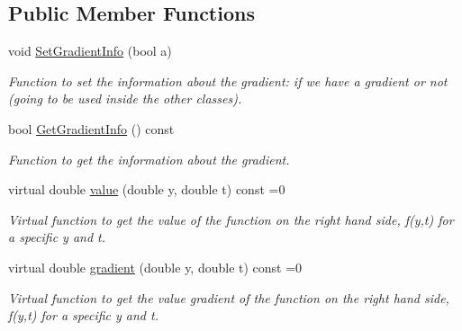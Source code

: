 \subsection*{Public Member Functions}
\begin{DoxyCompactItemize}
\item 
\hypertarget{class_righthandside_ab9a7d9fb588db3cf6f0793dd3c610b21}{}void \hyperlink{class_righthandside_ab9a7d9fb588db3cf6f0793dd3c610b21}{Set\+Gradient\+Info} (bool a)\label{class_righthandside_ab9a7d9fb588db3cf6f0793dd3c610b21}

\begin{DoxyCompactList}\small\item\em Function to set the information about the gradient\+: if we have a gradient or not (going to be used inside the other classes). \end{DoxyCompactList}\item 
\hypertarget{class_righthandside_a789dc740ce5310a1ee78ca5ff19d965e}{}bool \hyperlink{class_righthandside_a789dc740ce5310a1ee78ca5ff19d965e}{Get\+Gradient\+Info} () const \label{class_righthandside_a789dc740ce5310a1ee78ca5ff19d965e}

\begin{DoxyCompactList}\small\item\em Function to get the information about the gradient. \end{DoxyCompactList}\item 
\hypertarget{class_righthandside_a6d32d90b10cecbcd7950f7cd1d9eea31}{}virtual double \hyperlink{class_righthandside_a6d32d90b10cecbcd7950f7cd1d9eea31}{value} (double y, double t) const  =0\label{class_righthandside_a6d32d90b10cecbcd7950f7cd1d9eea31}

\begin{DoxyCompactList}\small\item\em Virtual function to get the value of the function on the right hand side, f(y,t) for a specific y and t. \end{DoxyCompactList}\item 
\hypertarget{class_righthandside_a39748896cba8f34c145b46235ff2ee1a}{}virtual double \hyperlink{class_righthandside_a39748896cba8f34c145b46235ff2ee1a}{gradient} (double y, double t) const  =0\label{class_righthandside_a39748896cba8f34c145b46235ff2ee1a}

\begin{DoxyCompactList}\small\item\em Virtual function to get the value gradient of the function on the right hand side, f\textquotesingle{}(y,t) for a specific y and t. \end{DoxyCompactList}\end{DoxyCompactItemize}


